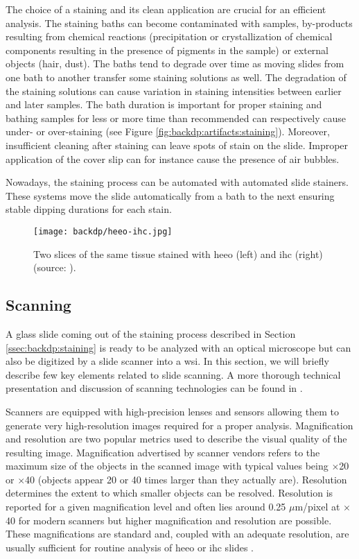 The choice of a staining and its clean application are crucial for an efficient analysis. The staining baths can become contaminated with samples, by-products resulting from chemical reactions (\eg precipitation or crystallization of chemical components resulting in the presence of pigments in the sample) or external objects (\eg hair, dust). The baths tend to degrade over time as moving slides from one bath to another transfer some staining solutions as well. The degradation of the staining solutions can cause variation in staining intensities between earlier and later samples. The bath duration is important for proper staining and bathing samples for less or more time than recommended can respectively cause under- or over-staining (see Figure \ref{fig:backdp:artifacts:staining}). Moreover, insufficient cleaning after staining can leave spots of stain on the slide. Improper application of the cover slip can for instance cause the presence of air bubbles. 

Nowadays, the staining process can be automated with automated slide stainers. These systems move the slide automatically from a bath to the next ensuring stable dipping durations for each stain.

\begin{figure}
  \centering
  \texttt{[image: backdp/heeo-ihc.jpg]}
  \caption{Two slices of the same tissue stained with \acrshort{heeo} (left) and \acrshort{ihc} (right) (source: \cite{litjens2018camelyon}).}
  \label{fig:backdp:heeo-ihc}
\end{figure}

\subsection{Scanning}
\label{ssec:backdp:scanning}

A glass slide coming out of the staining process described in Section \ref{ssec:backdp:staining} is ready to be analyzed with an optical microscope but can also be digitized by a slide scanner into a \acrshort{wsi}. In this section, we will briefly describe few key elements related to slide scanning. A more thorough technical presentation and discussion of scanning technologies can be found in \cite{patel2021contemporary}. 

Scanners are equipped with high-precision lenses and sensors allowing them to generate very high-resolution images required for a proper analysis. Magnification and resolution are two popular metrics used to describe the visual quality of the resulting image. Magnification advertised by scanner vendors refers to the maximum size of the objects in the scanned image with typical values being $\times$20 or $\times$40 (\ie objects appear 20 or 40 times larger than they actually are). Resolution determines the extent to which smaller objects can be resolved. Resolution is reported for a given magnification level and often lies around 0.25 $\mu$m/pixel at $\times$40 for modern scanners but higher magnification and resolution are possible. These magnifications are standard and, coupled with an adequate resolution, are usually sufficient for routine analysis of \acrshort{heeo} or \acrshort{ihc} slides \cite{zarella2019practical}.

